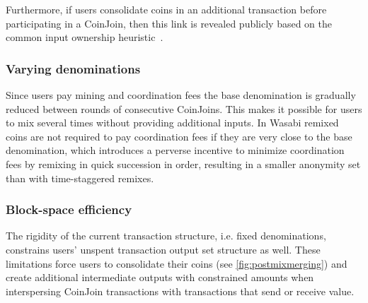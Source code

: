 \documentclass[a4paper]{article}
\begin{document}
Furthermore, if users consolidate coins in an additional transaction before participating in a CoinJoin, then this link is revealed publicly based on the common input ownership heuristic~\cite{meiklejohn2013fistful}.

\subsubsection{Varying denominations} Since users pay mining and coordination fees the base denomination is gradually reduced between rounds of consecutive CoinJoins. This makes it possible for users to mix several times without providing additional inputs. In Wasabi remixed coins are not required to pay coordination fees if they are very close to the base denomination, which introduces a perverse incentive to minimize coordination fees by remixing in quick succession in order, resulting in a smaller anonymity set than with time-staggered remixes.

\subsubsection{Block-space efficiency}

The rigidity of the current transaction structure, i.e. fixed denominations, constrains users' unspent transaction output set structure as well. These limitations force users to consolidate their coins (see \cref{fig:postmixmerging}) and create additional intermediate outputs with constrained amounts when interspersing CoinJoin transactions with transactions that send or receive value.
\end{document}
